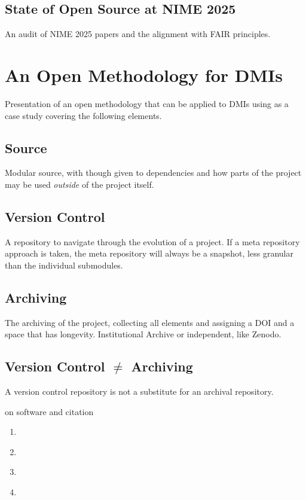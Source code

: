 \subsection{State of Open Source at NIME 2025}
An audit of NIME 2025 papers and the alignment with FAIR principles.

\section{An Open Methodology for DMIs}
Presentation of an open methodology that can be applied to DMIs using \cite{hamilton_augmentation_2025_activities} as a case study covering the following elements.

\subsection{Source}
Modular source, with though given to dependencies and how parts of the project may be used \textit{outside} of the project itself.
\subsection{Version Control}
A repository to navigate through the evolution of a project.
If a meta repository approach is taken, the meta repository will always be a snapshot, less granular than the individual submodules.
\subsection{Archiving}
The archiving of the project, collecting all elements and assigning a DOI and a space that has longevity. Institutional Archive or independent, like  Zenodo.
\subsection{Version Control $\neq$ Archiving}
A version control repository is not a substitute for an archival repository.

on software and citation

\begin{enumerate}
    \item  \citet{stall_journal_2023}
    \item  \citet{soito_citations_2016}
    \item  \citet{katz_recognizing_2021}
    \item  \citet{smith_software_2016}
\end{enumerate}

